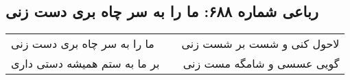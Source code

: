 \begin{center}
\section*{رباعی شماره ۶۸۸: ما را به سر چاه بری دست زنی}
\label{sec:sh688}
\begin{longtable}{l p{0.5cm} r}
ما را به سر چاه بری دست زنی
&&
لاحول کنی و شست بر شست زنی
\\
بر ما به ستم همیشه دستی داری
&&
گویی عسسی و شامگه مست زنی
\\
\end{longtable}
\end{center}
